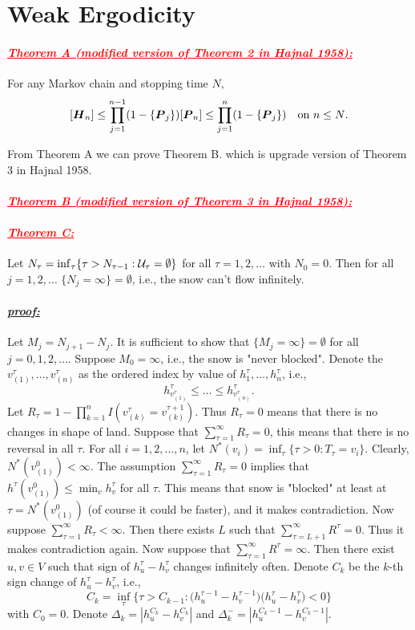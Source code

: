 \documentclass[12pt,oneside,english,a4paper]{article}
\newcommand{\para}[1]{\paragraph{\LARGE\it\underline{\textbf{#1:}}}\LARGE}
\newcommand{\parared}[1]{\paragraph{\LARGE\textcolor{red}{\it\underline{\textbf{#1:}}}}\LARGE}
\newcommand{\bsH}{\mbox{\boldmath $H$}}
\newcommand{\bsP}{\mbox{\boldmath $P$}}
\begin{document}
\section{Weak Ergodicity}
\parared{Theorem A \large{(modified version of Theorem 2 in Hajnal 1958)}} 
For any Markov chain and stopping time $N$, 
\[
[\bsH_n]\leq \prod_{j=1}^{n-1}(1-\{\bsP_j\})[\bsP_n]\leq \prod_{j=1}^{n}(1-\{\bsP_j\}) \quad \mbox{on $n \leq N$.}
\]

From Theorem A we can prove Theorem B. which is upgrade version of Theorem 3 in Hajnal 1958.

\parared{Theorem B \large{(modified version of Theorem 3 in Hajnal 1958)}} 


\parared{Theorem C} Let $N_{\tau}=\inf_\tau\{\tau>N_{\tau-1}: {\cal U}_{\tau}=\emptyset \}$ for all $\tau=1,2,\dots$ with $N_0=0$. Then for all $j=1,2,\dots$ $\{N_j=\infty\}=\emptyset$, i.e., the snow can't flow infinitely.

\para{proof} Let $M_j=N_{j+1}-N_j$. It is sufficient to show that $\{M_j=\infty\}=\emptyset$ for all $j=0,1,2,\dots$. 
Suppose $M_0=\infty$, i.e., the snow is "never blocked". Denote the $v^{\tau}_{(1)},\dots,v^{\tau}_{(n)}$ as the ordered index by value of $h^{\tau}_1,\dots,h^{\tau}_n$, i.e., 
\[
h_{v_{(1)}^{\tau}}^{\tau} \leq \dots \leq h_{v_{(n)}^{\tau}}^{\tau}.
\]
Let $R_\tau=1-\prod_{k=1}^{n}I(v_{(k)}^{\tau}=v_{(k)}^{\tau+1})$. Thus $R_{\tau}=0$ means that there is no changes in shape of land. Suppose that $\sum_{\tau=1}^{\infty}R_{\tau}=0$, this means that there is no reversal in all $\tau$. For all $i=1,2,\dots,n$, let $N^{*}(v_i)=\inf_{\tau}\{\tau>0: T_\tau=v_i \}$. Clearly, $N^*({v_{(1)}^0})<\infty$. The assumption $\sum_{\tau=1}^{\infty}R_\tau=0$ implies that $h^{\tau}(v_{(1)}^0)\leq \min_v h_v^{\tau}$ for all $\tau$. This means that snow is "blocked" at least at $\tau=N^*(v_{(1)}^0)$ (of course it could be faster), and it makes contradiction. Now suppose $\sum_{\tau=1}^{\infty}R_{\tau}<\infty$. Then there exists $L$ such that $\sum_{\tau=L+1}^{\infty} R^{\tau} =0$. Thus it makes contradiction again. Now suppose that $\sum_{\tau=1}^{\infty} R^\tau=\infty$. Then there exist $u,v \in V$ such that sign of $h^{\tau}_u-h^{\tau}_v$ changes infinitely often. Denote $C_k$ be the $k$-th sign change of $h^{\tau}_u-h^{\tau}_v$, i.e., 
\[
C_k=\inf_{\tau}\Big\{\tau>C_{k-1}: \big(h^{\tau-1}_u-h^{\tau-1}_v\big)\big(h^{\tau}_u-h^{\tau}_v\big)<0 \Big\}
\]
with $C_0=0$. Denote $\Delta_k=|h_u^{C_k}-h_v^{C_k}|$ and $\Delta_k^-=|h_u^{C_k-1}-h_v^{C_k-1}|$. 
\end{document}
